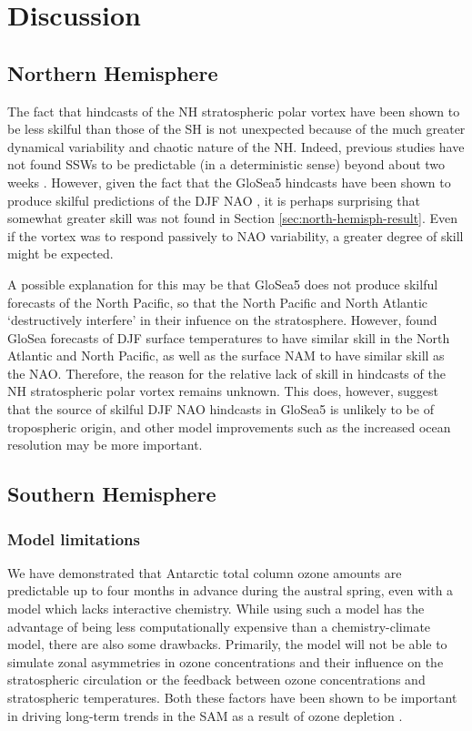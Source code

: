 \section{Discussion}
\label{sec:seas-discussion}
\subsection{Northern Hemisphere}

The fact that hindcasts of the NH stratospheric polar vortex have been shown to
be less skilful than those of the SH is not unexpected because of the much
greater dynamical variability and chaotic nature of the NH. Indeed, previous
studies have not found SSWs to be predictable (in a deterministic sense) beyond
about two weeks \citep{Marshall2010,Taguchi2014}. However, given the fact that
the GloSea5 hindcasts have been shown to produce skilful predictions of the DJF
NAO \citep{Scaife2013}, it is perhaps surprising that somewhat greater skill was
not found in Section \ref{sec:north-hemisph-result}. Even if the vortex was to
respond passively to NAO variability, a greater degree of skill might be
expected.

A possible explanation for this may be that GloSea5 does not produce skilful
forecasts of the North Pacific, so that the North Pacific and North Atlantic
`destructively interfere' in their infuence on the stratosphere. However,
\citet{MacLachlan2014} found GloSea forecasts of DJF surface temperatures to
have similar skill in the North Atlantic and North Pacific, as well as the
surface NAM to have similar skill as the NAO. Therefore, the reason for the
relative lack of skill in hindcasts of the NH stratospheric polar vortex remains
unknown. This does, however, suggest that the source of skilful DJF NAO
hindcasts in GloSea5 is unlikely to be of tropospheric origin, and other model
improvements such as the increased ocean resolution may be more important.


\subsection{Southern Hemisphere}
\subsubsection{Model limitations}

We have demonstrated that Antarctic total column ozone amounts are predictable
up to four months in advance during the austral spring, even with a model which
lacks interactive chemistry. While using such a model has the advantage of being
less computationally expensive than a chemistry-climate model, there are also
some drawbacks. Primarily, the model will not be able to simulate zonal
asymmetries in ozone concentrations and their influence on the stratospheric
circulation or the feedback between ozone concentrations and stratospheric
temperatures. Both these factors have been shown to be important in driving
long-term trends in the SAM as a result of ozone depletion \citep{Thompson2002a,
  Crook2008, Waugh2009}.

